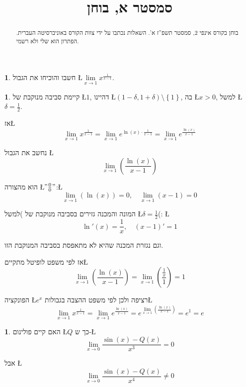 \documentclass[english,hebrew]{article}
\theoremstyle{plain}
\theoremstyle{definition}
\newtheorem{problem}[thm]{\protect\problemname}
\theoremstyle{definition}
\newtheorem*{sol*}{\protect\solutionname}
\providecommand{\problemname}{בעיה}
\providecommand{\solutionname}{פתרון}
\begin{document}
\title{סמסטר {\endL}א, בוחן {\endL}}
\maketitle
\begin{abstract}
בוחן {\endL} בקורס אינפי 2, סמסטר תשפ”ז א’. השאלות נכתבו
על ידי צוות הקורס באוניברסיטה העברית. הפתרון הוא שלי ולא רשמי.
\end{abstract}
\begin{problem}
חשבו והוכיחו את הגבול \L{$\underset{x\rightarrow1}{\lim}x^{\frac{1}{x-1}}$}.
\end{problem}

\begin{sol*}
קיימת סביבה מנוקבת של \L{$1$}, דהיינו \L{$\left(1-\delta,1+\delta\right)\setminus\left\{ 1\right\} $},
בה \L{$x>0$}, למשל \L{$\delta=\frac{1}{2}$}.

אז\L{%
\[
\underset{x\rightarrow1}{\lim}x^{\frac{1}{x-1}}=\underset{x\rightarrow1}{\lim}e^{\ln\left(x\right)\cdot\frac{1}{x-1}}=\underset{x\rightarrow1}{\lim}e^{\frac{\ln\left(x\right)}{x-1}}
\]
}%

נחשב את הגבול \L{%
\[
\underset{x\rightarrow1}{\lim}\left(\frac{\ln\left(x\right)}{x-1}\right)
\]
}%

הוא מהצורה \L{$"\frac{0}{0}"$}:\L{%
\[
\underset{x\rightarrow1}{\lim}\left(\ln\left(x\right)\right)=0,\quad\underset{x\rightarrow1}{\lim}\left(x-1\right)=0
\]
}%

המונה והמכנה גזירים בסביבה מנוקבת של {\endL} )למשל \L{$\delta=\frac{1}{2}$}(:
\L{%
\[
\ln'(x)=\frac{1}{x},\quad\left(x-1\right)'=1
\]
}%

וגם נגזרת המכנה שהיא {\endL} לא מתאפסת בסביבה המנוקבת הזו. 

אז לפי משפט לופיטל מתקיים\L{%
\[
\underset{x\rightarrow1}{\lim}\left(\frac{\ln\left(x\right)}{x-1}\right)=\underset{x\rightarrow1}{\lim}\left(\frac{\frac{1}{x}}{1}\right)=1
\]
}%

הפונקציה \L{$e^{x}$} רציפה ולכן לפי משפט ההצבה בגבולות\L{%
\[
\underset{x\rightarrow1}{\lim}x^{\frac{1}{x-1}}=\underset{x\rightarrow1}{\lim}e^{\frac{\ln\left(x\right)}{x-1}}=e^{\underset{x\rightarrow1}{\lim}\left(\frac{\ln\left(x\right)}{x-1}\right)}=e^{1}=e
\]
}%

\newpage{}
\end{sol*}
\begin{problem}
האם קיים פולינום \L{$Q$} כך ש-\L{%
\[
\underset{x\rightarrow0}{\lim}\frac{\sin\left(x\right)-Q\left(x\right)}{x^{3}}=0
\]
}%

אבל \L{%
\[
\underset{x\rightarrow0}{\lim}\frac{\sin\left(x\right)-Q\left(x\right)}{x^{4}}\ne0
\]
}%
\end{problem}
\end{document}
